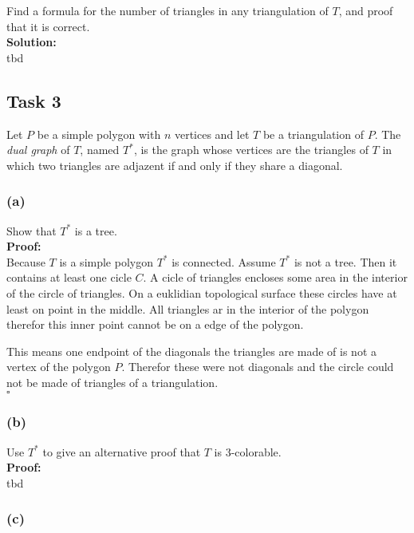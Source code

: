 \documentclass[11pt,a4paper,ngerman]{article}
\begin{document}
Find a formula for the number of triangles in any triangulation of $T$, and proof that it is correct.\\

\textbf{Solution:}\\

tbd

\subsection*{Task 3}

Let $P$ be a simple polygon with $n$ vertices and let $T$ be a triangulation of $P$. The \emph{dual graph} of $T$,
named $T^*$, is the graph whose vertices are the triangles of $T$ in which two triangles are adjazent if and only if
they share a diagonal.

\subsubsection*{(a)}
Show that $T^*$ is a tree.\\

\textbf{Proof:}\\

Because $T$ is a simple polygon $T^*$ is connected. Assume $T^*$ is not a tree. Then it contains at least one
cicle $C$. A cicle of triangles encloses some area in the interior of the circle of triangles. On a euklidian
topological surface these circles have at least on point in the middle. All triangles ar in the interior of the polygon
therefor this inner point cannot be on a edge of the polygon.

This means one endpoint of the diagonals the triangles are made of is not a vertex of the polygon $P$. Therefor these
were not diagonals and the circle could not be made of triangles of a triangulation.\\
\mbox{}\hfill$\square$

\subsubsection*{(b)}

Use $T^*$ to give an alternative proof that $T$ is 3-colorable.\\

\textbf{Proof:}\\

tbd

\subsubsection*{(c)}
\end{document}
